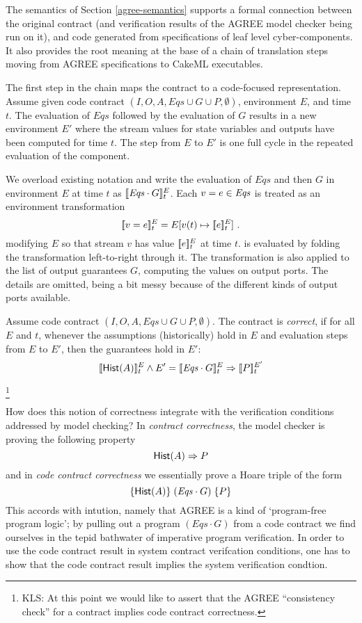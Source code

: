 The semantics of Section \ref{agree-semantics} supports a formal
connection between the original contract (and verification results of
the AGREE model checker being run on it), and code generated from
specifications of leaf level cyber-components. It also provides the
root meaning at the base of a chain of translation steps moving from
AGREE specifications to CakeML executables.

The first step in the chain maps the contract to a code-focused
representation. Assume given code contract $(I,O,A,\mathit{Eqs} \cup G \cup
P,\emptyset)$, environment $E$, and time $t$. The evaluation of $\mathit{Eqs}$
followed by the evaluation of $G$ results in a new environment $E'$
where the stream values for state variables and outputs have been
computed for time $t$. The step from $E$ to $E'$ is one full cycle in
the repeated evaluation of the component.

\begin{definition}[Evaluation]
We overload existing notation and write the evaluation of
$\mathit{Eqs}$ and then $G$ in environment $E$ at time $t$ as
$[\![ \mathit{Eqs}\cdot G ]\!]^E_t$. Each $v = e \in {\ensuremath{\mathit{Eqs}}}$ is treated as
an environment transformation
\[
 [\![ v = e ]\!]^E_t = E[v(t) \mapsto[\![ e ]\!]^E_t] \ .
\]
modifying $E$ so that stream $v$ has value $[\![ e ]\!]^E_t$ at time $t$.
{\Eqs} is evaluated by folding the transformation left-to-right
through it. The transformation is also applied to the list of output
guarantees $G$, computing the values on output ports. The details are
omitted, being a bit messy because of the different kinds of output
ports available.
\end{definition}


\begin{definition}
Assume code contract $(I,O,A,\mathit{Eqs} \cup G \cup P,\emptyset)$.
The contract is \emph{correct}, if for all $E$ and $t$, whenever the
assumptions (historically) hold in $E$ and evaluation steps from $E$
to $E'$, then the guarantees hold in $E'$:
\[
[\![ \mathsf{Hist}(A) ]\!]^E_t \land E' = [\![ \mathit{Eqs} \cdot G ]\!]^E_t \Rightarrow [\![ P ]\!]^{E'}_t
\]
\end{definition}
\footnote
{KLS: At this point we would like to assert that the AGREE ``consistency
 check'' for a contract implies code contract correctness.}

How does this notion of correctness integrate with the verification
conditions addressed by model checking? In \emph{contract
correctness}, the model checker is proving the following property
\[
\mathsf{Hist}(A) \Rightarrow P
\]
and in \emph{code contract correctness} we essentially prove a Hoare
triple of the form
\[
\{ {\mathsf{Hist}(A)} \}\; (\mathit{Eqs} \cdot G) \; \{ {P} \}
\]
This accords with intution, namely that AGREE is a kind of
`program-free program logic'; by pulling out a program $(\mathit{Eqs}
\cdot G)$ from a code contract we find ourselves in the tepid
bathwater of imperative program verification. In order to use the code
contract result in system contract verifcation conditions, one has to
show that the code contract result implies the system verification
condtion.

